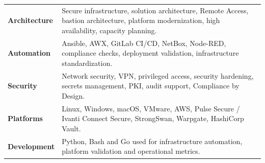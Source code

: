 
\begin{tabularx}{\textwidth}{@{}>{\bfseries}p{3.3cm}X@{}}
Architecture & Secure infrastructure, solution architecture, Remote Access, bastion architecture, platform modernization, high availability, capacity planning.\\
Automation & Ansible, AWX, GitLab CI/CD, NetBox, Node-RED, compliance checks, deployment validation, infrastructure standardization.\\
Security & Network security, VPN, privileged access, security hardening, secrets management, PKI, audit support, Compliance by Design.\\
Platforms & Linux, Windows, macOS, VMware, AWS, Pulse Secure / Ivanti Connect Secure, StrongSwan, Warpgate, HashiCorp Vault.\\
Development & Python, Bash and Go used for infrastructure automation, platform validation and operational metrics.\\
\end{tabularx}
